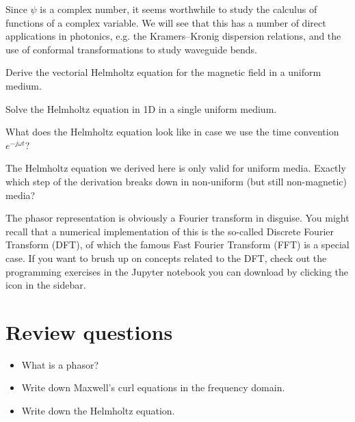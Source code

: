 Since $\psi$ is a complex number, it seems worthwhile to study the calculus of functions of a complex variable. We will see that this has a number of direct applications in photonics, e.g. the Kramers--Kronig dispersion relations, and the use of conformal transformations to study waveguide bends.

\begin{exer}
  \label{ex-helm-h-uniform}
Derive the vectorial Helmholtz equation for the magnetic field in a uniform medium.
\end{exer}

\begin{exer}
Solve the Helmholtz equation in 1D in a single uniform medium.
\end{exer}

\begin{exer}
What does the Helmholtz equation look like in case we use the time convention  $e^{-j \omega t}$? 
\end{exer}

\begin{exer}
The Helmholtz equation we derived here is only valid for uniform media. Exactly which step of the derivation breaks down in non-uniform (but still non-magnetic) media?
\end{exer}

\begin{exer}
The phasor representation is obviously a Fourier transform in disguise. You might recall that a numerical implementation of this is the so-called Discrete Fourier Transform (DFT), of which the famous Fast Fourier Transform (FFT) is a special case. If you want to brush up on concepts related to the DFT, check out the programming exercises in the Jupyter notebook you can download by clicking the icon in the sidebar.
\end{exer}

\section*{Review questions}

\begin{itemize}
\item What is a phasor?
\item Write down Maxwell's curl equations in the frequency domain.
\item Write down the Helmholtz equation.
\end{itemize}



